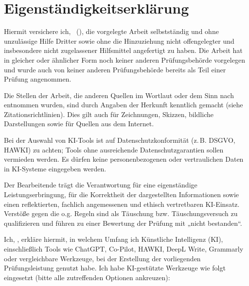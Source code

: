 \pagestyle{empty} 
\chapter*{Eigenständigkeitserklärung}
\thispagestyle{empty} %

Hiermit versichere ich, \Autor\ (\Matrikelnummer), die vorgelegte Arbeit selbstständig und ohne unzulässige Hilfe Dritter sowie ohne die Hinzuziehung nicht offengelegter und insbesondere nicht zugelassener Hilfsmittel angefertigt zu haben. Die Arbeit hat in gleicher oder ähnlicher Form noch keiner anderen Prüfungsbehörde vorgelegen und wurde auch von keiner anderen Prüfungsbehörde bereits als Teil einer Prüfung angenommen.

Die Stellen der Arbeit, die anderen Quellen im Wortlaut oder dem Sinn nach entnommen wurden, sind durch Angaben der Herkunft kenntlich gemacht (siehe Zitationsrichtlinien). Dies gilt auch für Zeichnungen, Skizzen, bildliche Darstellungen sowie für Quellen aus dem Internet.

Bei der Auswahl von KI-Tools ist auf Datenschutzkonformität (z.\,B. DSGVO, HAWKI) zu achten; Tools ohne ausreichende Datenschutzgarantien sollen vermieden werden. Es dürfen keine personenbezogenen oder vertraulichen Daten in KI-Systeme eingegeben werden.

Der Bearbeitende trägt die Verantwortung für eine eigenständige Leistungserbringung, für die Korrektheit der dargestellten Informationen sowie einen reflektierten, fachlich angemessenen und ethisch vertretbaren KI-Einsatz. Verstöße gegen die o.g. Regeln sind als Täuschung bzw. Täuschungsversuch zu qualifizieren und führen zu einer Bewertung der Prüfung mit „nicht bestanden“.

Ich, \Autor, erkläre hiermit, in welchem Umfang ich Künstliche Intelligenz (KI), einschließlich Tools wie ChatGPT, Co-Pilot, HAWKI, DeepL Write, Grammarly oder vergleichbare Werkzeuge, bei der Erstellung der vorliegenden Prüfungsleistung genutzt habe. Ich habe KI-gestützte Werkzeuge wie folgt eingesetzt (bitte alle zutreffenden Optionen ankreuzen):

